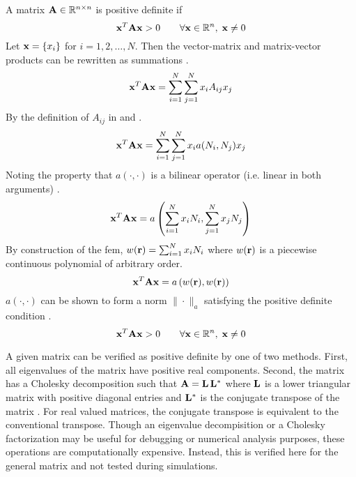     A matrix $\mathbf{A} \in \mathbb{R}^{n \times n}$ is positive definite if
    \begin{equation} \label{eq:positive_definite}
      \mathbf{x}^{T} \mathbf{A} \mathbf{x} > 0 \qquad \forall \mathbf{x} \in \mathbb{R}^{n}, \; \mathbf{x} \ne 0
    \end{equation}
    Let $\mathbf{x} = \{x_i\}$ for $i = 1,2,\ldots,N$. Then the vector-matrix and 
    matrix-vector products can be rewritten as summations \cite{textbookhughes}.
    \begin{equation}
      \mathbf{x}^{T} \mathbf{A} \mathbf{x} = \sum_{i=1}^{N} \sum_{j=1}^{N} x_i A_{ij} x_j
    \end{equation}
    By the definition of $A_{ij}$ in  and 
    .
    \begin{equation}
      \mathbf{x}^{T} \mathbf{A} \mathbf{x} = 
        \sum_{i=1}^{N} \sum_{j=1}^{N} x_i a(N_i,N_j) x_j
    \end{equation}
    Noting the property that $a(\cdot,\cdot)$ is a bilinear operator (i.e.
    linear in both arguments) \cite{textbookli}.
    \begin{equation}
      \mathbf{x}^{T} \mathbf{A} \mathbf{x} =
        a \left( \sum_{i=1}^{N} x_i N_i, \sum_{j=1}^{N} x_j N_j 
        \right)
    \end{equation}
    By construction of the \gls{fem}, $w(\mathbf{r}) = \sum_{i=1}^{N} x_i N_i$ 
    where $w(\mathbf{r})$ is a piecewise continuous polynomial of arbitrary order.
    \begin{equation}
      \mathbf{x}^{T} \mathbf{A} \mathbf{x} = a \left(w(\mathbf{r}),w(\mathbf{r})\right)
    \end{equation}
    $a(\cdot,\cdot)$ can be shown to form a norm $\|\cdot \|_a$
    \cite{textbookli} satisfying the positive definite condition
    .
    \begin{equation}
      \mathbf{x}^{T} \mathbf{A} \mathbf{x} > 0 \qquad \forall \mathbf{x} \in \mathbb{R}^{n}, \; \mathbf{x} \ne 0
    \end{equation}
    
    A given matrix can be verified as positive definite by one of two methods.
    First, all eigenvalues of the matrix have positive real components. Second,
    the matrix has a Cholesky decomposition such that $\mathbf{A} = \mathbf{L} \, \mathbf{L}^*$ where
    $\mathbf{L}$ is a lower triangular matrix with positive diagonal entries and
    $\mathbf{L}^*$ is the conjugate transpose of the matrix \cite{textbookipsen}. For
    real valued matrices, the conjugate transpose is equivalent to the
    conventional transpose. Though an eigenvalue decompisition or a Cholesky
    factorization may be useful for debugging or numerical analysis purposes, 
    these operations are computationally expensive. Instead, this is verified 
    here for the general matrix and not tested during simulations.
    
